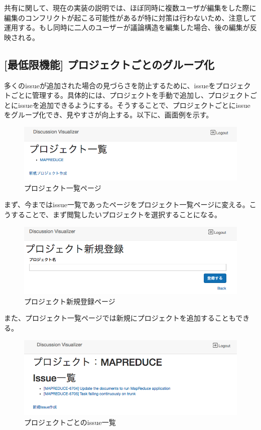 \documentclass[12pt, oneside]{jreport}
\begin{document}
		共有に関して、現在の実装の説明では、ほぼ同時に複数ユーザが編集をした際に編集のコンフリクトが起こる可能性があるが特に対策は行わないため、注意して運用する。もし同時に二人のユーザーが議論構造を編集した場合、後の編集が反映される。
		
		\subsection{[最低限機能] プロジェクトごとのグループ化}
		多くのissueが追加された場合の見づらさを防止するために、issueをプロジェクトごとに管理する。具体的には、プロジェクトを手動で追加し、プロジェクトごとにissueを追加できるようにする。そうすることで、プロジェクトごとにissueをグループ化でき、見やすさが向上する。以下に、画面例を示す。
		
		\begin{figure}[H]
		\centering
		\includegraphics[width=17cm,bb=700 300 -200 27]{ProjectList.png}
		\caption{プロジェクト一覧ページ}
		\end{figure}
		
		まず、今まではissue一覧であったページをプロジェクト一覧ページに変える。こうすることで、まず閲覧したいプロジェクトを選択することになる。
			
		\begin{figure}[H]
		\centering
		\includegraphics[width=17cm,bb=500 300 -200 27]{ProjectAdd.png}
		\caption{プロジェクト新規登録ページ}
		\end{figure}
		
		また、プロジェクト一覧ページでは新規にプロジェクトを追加することもできる。
		
		\begin{figure}[H]
		\centering
		\includegraphics[width=17cm,bb=500 300 -200 27]{ProjectissueList.png}
		\caption{プロジェクトごとのissue一覧}
		\end{figure}
		
\end{document}
